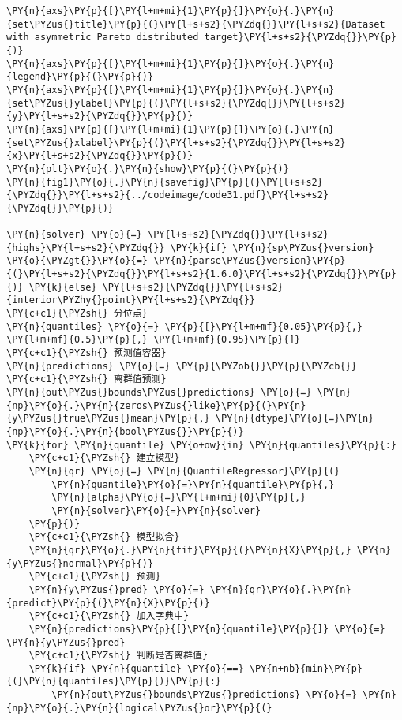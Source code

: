 \begin{Verbatim}[commandchars=\\\{\}]
\PY{n}{axs}\PY{p}{[}\PY{l+m+mi}{1}\PY{p}{]}\PY{o}{.}\PY{n}{set\PYZus{}title}\PY{p}{(}\PY{l+s+s2}{\PYZdq{}}\PY{l+s+s2}{Dataset with asymmetric Pareto distributed target}\PY{l+s+s2}{\PYZdq{}}\PY{p}{)}
\PY{n}{axs}\PY{p}{[}\PY{l+m+mi}{1}\PY{p}{]}\PY{o}{.}\PY{n}{legend}\PY{p}{(}\PY{p}{)}
\PY{n}{axs}\PY{p}{[}\PY{l+m+mi}{1}\PY{p}{]}\PY{o}{.}\PY{n}{set\PYZus{}ylabel}\PY{p}{(}\PY{l+s+s2}{\PYZdq{}}\PY{l+s+s2}{y}\PY{l+s+s2}{\PYZdq{}}\PY{p}{)}
\PY{n}{axs}\PY{p}{[}\PY{l+m+mi}{1}\PY{p}{]}\PY{o}{.}\PY{n}{set\PYZus{}xlabel}\PY{p}{(}\PY{l+s+s2}{\PYZdq{}}\PY{l+s+s2}{x}\PY{l+s+s2}{\PYZdq{}}\PY{p}{)}
\PY{n}{plt}\PY{o}{.}\PY{n}{show}\PY{p}{(}\PY{p}{)}
\PY{n}{fig1}\PY{o}{.}\PY{n}{savefig}\PY{p}{(}\PY{l+s+s2}{\PYZdq{}}\PY{l+s+s2}{../codeimage/code31.pdf}\PY{l+s+s2}{\PYZdq{}}\PY{p}{)}

\PY{n}{solver} \PY{o}{=} \PY{l+s+s2}{\PYZdq{}}\PY{l+s+s2}{highs}\PY{l+s+s2}{\PYZdq{}} \PY{k}{if} \PY{n}{sp\PYZus{}version} \PY{o}{\PYZgt{}}\PY{o}{=} \PY{n}{parse\PYZus{}version}\PY{p}{(}\PY{l+s+s2}{\PYZdq{}}\PY{l+s+s2}{1.6.0}\PY{l+s+s2}{\PYZdq{}}\PY{p}{)} \PY{k}{else} \PY{l+s+s2}{\PYZdq{}}\PY{l+s+s2}{interior\PYZhy{}point}\PY{l+s+s2}{\PYZdq{}}
\PY{c+c1}{\PYZsh{} 分位点}
\PY{n}{quantiles} \PY{o}{=} \PY{p}{[}\PY{l+m+mf}{0.05}\PY{p}{,} \PY{l+m+mf}{0.5}\PY{p}{,} \PY{l+m+mf}{0.95}\PY{p}{]}
\PY{c+c1}{\PYZsh{} 预测值容器}
\PY{n}{predictions} \PY{o}{=} \PY{p}{\PYZob{}}\PY{p}{\PYZcb{}}
\PY{c+c1}{\PYZsh{} 离群值预测}
\PY{n}{out\PYZus{}bounds\PYZus{}predictions} \PY{o}{=} \PY{n}{np}\PY{o}{.}\PY{n}{zeros\PYZus{}like}\PY{p}{(}\PY{n}{y\PYZus{}true\PYZus{}mean}\PY{p}{,} \PY{n}{dtype}\PY{o}{=}\PY{n}{np}\PY{o}{.}\PY{n}{bool\PYZus{}}\PY{p}{)}
\PY{k}{for} \PY{n}{quantile} \PY{o+ow}{in} \PY{n}{quantiles}\PY{p}{:}
    \PY{c+c1}{\PYZsh{} 建立模型}
    \PY{n}{qr} \PY{o}{=} \PY{n}{QuantileRegressor}\PY{p}{(}
        \PY{n}{quantile}\PY{o}{=}\PY{n}{quantile}\PY{p}{,} 
        \PY{n}{alpha}\PY{o}{=}\PY{l+m+mi}{0}\PY{p}{,} 
        \PY{n}{solver}\PY{o}{=}\PY{n}{solver}
    \PY{p}{)}
    \PY{c+c1}{\PYZsh{} 模型拟合}
    \PY{n}{qr}\PY{o}{.}\PY{n}{fit}\PY{p}{(}\PY{n}{X}\PY{p}{,} \PY{n}{y\PYZus{}normal}\PY{p}{)}
    \PY{c+c1}{\PYZsh{} 预测}
    \PY{n}{y\PYZus{}pred} \PY{o}{=} \PY{n}{qr}\PY{o}{.}\PY{n}{predict}\PY{p}{(}\PY{n}{X}\PY{p}{)}
    \PY{c+c1}{\PYZsh{} 加入字典中}
    \PY{n}{predictions}\PY{p}{[}\PY{n}{quantile}\PY{p}{]} \PY{o}{=} \PY{n}{y\PYZus{}pred}
    \PY{c+c1}{\PYZsh{} 判断是否离群值}
    \PY{k}{if} \PY{n}{quantile} \PY{o}{==} \PY{n+nb}{min}\PY{p}{(}\PY{n}{quantiles}\PY{p}{)}\PY{p}{:}
        \PY{n}{out\PYZus{}bounds\PYZus{}predictions} \PY{o}{=} \PY{n}{np}\PY{o}{.}\PY{n}{logical\PYZus{}or}\PY{p}{(}

\end{Verbatim}
